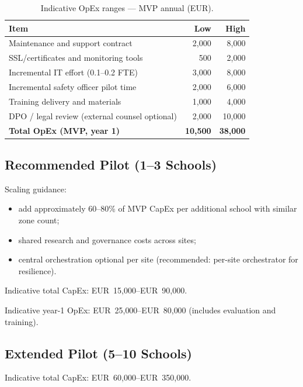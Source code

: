 \begin{table}[htbp]
  \centering
  \caption{Indicative OpEx ranges --- MVP annual (EUR).}
  \label{tab:opex-mvp}
  \small
  \begin{tabular}{@{}lrr@{}}
    \toprule
    Item & Low & High \\
    \midrule
    Maintenance and support contract & 2{,}000 & 8{,}000 \\
    SSL/certificates and monitoring tools & 500 & 2{,}000 \\
    Incremental IT effort (0.1--0.2 FTE) & 3{,}000 & 8{,}000 \\
    Incremental safety officer pilot time & 2{,}000 & 6{,}000 \\
    Training delivery and materials & 1{,}000 & 4{,}000 \\
    DPO / legal review (external counsel optional) & 2{,}000 & 10{,}000 \\
    \midrule
    \textbf{Total OpEx (MVP, year 1)} & \textbf{10{,}500} & \textbf{38{,}000} \\
    \bottomrule
  \end{tabular}
\end{table}

\subsection{Recommended Pilot (1--3 Schools)}

Scaling guidance:
\begin{itemize}[noitemsep]
  \item add approximately 60--80\% of MVP CapEx per additional school with similar zone count;
  \item shared research and governance costs across sites;
  \item central orchestration optional per site (recommended: per-site orchestrator for resilience).
\end{itemize}

Indicative total CapEx: EUR~15{,}000--EUR~90{,}000.

Indicative year-1 OpEx: EUR~25{,}000--EUR~80{,}000 (includes evaluation and training).

\subsection{Extended Pilot (5--10 Schools)}

Indicative total CapEx: EUR~60{,}000--EUR~350{,}000.

